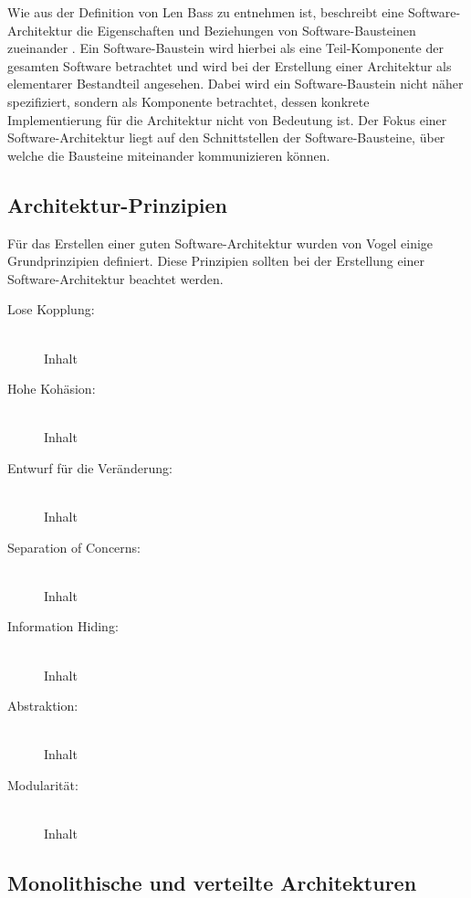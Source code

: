 Wie aus der Definition von Len Bass zu entnehmen ist, beschreibt eine Software-Architektur die Eigenschaften und Beziehungen von Software-Bausteinen zueinander \cite{Bass.2013}. Ein Software-Baustein wird hierbei als eine Teil-Komponente der gesamten Software betrachtet und wird bei der Erstellung einer Architektur als elementarer Bestandteil angesehen. Dabei wird ein Software-Baustein nicht näher spezifiziert, sondern als Komponente betrachtet, dessen konkrete Implementierung für die Architektur nicht von Bedeutung ist. Der Fokus einer Software-Architektur liegt auf den Schnittstellen der Software-Bausteine, über welche die Bausteine miteinander kommunizieren können.

\subsection{Architektur-Prinzipien\label{subsec2.1.1:Unterunterpunkt-1}}

Für das Erstellen einer guten Software-Architektur wurden von Vogel \cite{Vogel.2009} einige Grundprinzipien definiert. Diese Prinzipien sollten bei der Erstellung einer Software-Architektur beachtet werden.

\begin{description}
    \item[Lose Kopplung:]\hfill \\
    Inhalt

    \item[Hohe Kohäsion:]\hfill \\
    Inhalt

    \item[Entwurf für die Veränderung:]\hfill \\
    Inhalt

    \item[Separation of Concerns:]\hfill \\
    Inhalt

    \item[Information Hiding:]\hfill \\
    Inhalt

    \item[Abstraktion:]\hfill \\
    Inhalt

    \item[Modularität:]\hfill \\
    Inhalt

\end{description}

\subsection{Monolithische und verteilte Architekturen\label{subsec2.1.2:Unterunterpunkt-2}}

